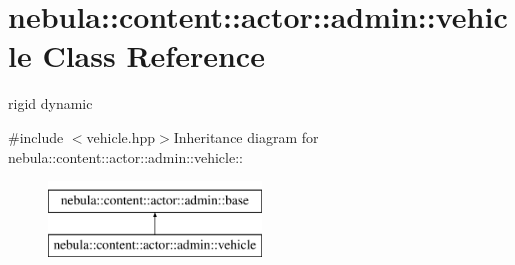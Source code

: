 \hypertarget{classnebula_1_1content_1_1actor_1_1admin_1_1vehicle}{
\section{nebula::content::actor::admin::vehicle Class Reference}
\label{classnebula_1_1content_1_1actor_1_1admin_1_1vehicle}
}


rigid dynamic  


{\ttfamily \#include $<$vehicle.hpp$>$}Inheritance diagram for nebula::content::actor::admin::vehicle::\begin{figure}[H]
\begin{center}
\leavevmode
\includegraphics[height=2cm]{classnebula_1_1content_1_1actor_1_1admin_1_1vehicle}
\end{center}
\end{figure}
